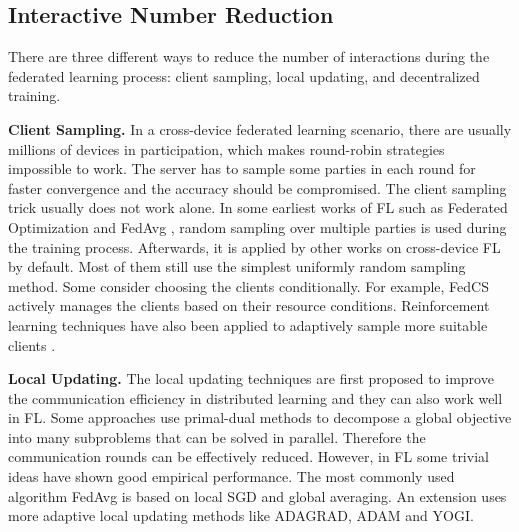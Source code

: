 \documentclass[11pt]{article}
\newcommand{\fakeparagraph}[1]{\vspace{1mm}\noindent\textbf{#1.}}
\begin{document}
\subsection{Interactive Number Reduction}

There are three different ways to reduce the number of interactions during the federated learning process: client sampling, 
local updating, 
and decentralized training.

\fakeparagraph{Client Sampling}
In a cross-device federated learning scenario, there are usually millions of devices in participation, which makes round-robin strategies impossible to work. 
The server has to sample some parties in each round for faster convergence and the accuracy should be compromised.
The client sampling trick usually does not work alone.
In some earliest works of FL such as Federated Optimization \cite{DBLP:journals/corr/KonecnyMR15} and FedAvg \cite{DBLP:conf/aistats/McMahanMRHA17}, random sampling over multiple parties is used during the training process. 
Afterwards, it is applied by other works on cross-device FL by default.
Most of them still use the simplest uniformly random sampling method.
Some consider choosing the clients conditionally.
For example, FedCS \cite{DBLP:conf/icc/NishioY19} actively manages the clients based on their resource conditions. 
Reinforcement learning techniques have also been applied to adaptively sample more suitable clients \cite{DBLP:conf/infocom/WangKNL20}.

\fakeparagraph{Local Updating}
The local updating techniques are first proposed to improve the communication efficiency in distributed learning and they can also work well in FL.
Some approaches use primal-dual methods to decompose a global objective into many subproblems that can be solved in parallel. Therefore the communication rounds can be effectively reduced.
However, in FL some trivial ideas have shown good empirical performance. The most commonly used algorithm FedAvg \cite{DBLP:conf/aistats/McMahanMRHA17} is based on local SGD and global averaging. An extension \cite{DBLP:journals/corr/abs-2003-00295} uses more adaptive local updating methods like ADAGRAD, ADAM and YOGI.
\end{document}
